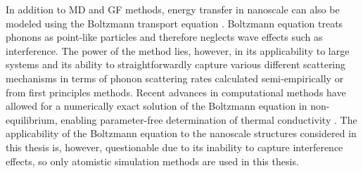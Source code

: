 In addition to MD and GF methods, energy transfer in nanoscale can also be modeled using the Boltzmann transport equation \cite{ziman}. Boltzmann equation treats phonons as point-like particles and therefore neglects wave effects such as interference. The power of the method lies, however, in its applicability to large systems and its ability to straightforwardly capture various different scattering mechanisms in terms of phonon scattering rates calculated semi-empirically or from first principles methods. Recent advances in computational methods have allowed for a numerically exact solution of the Boltzmann equation in non-equi\-lib\-rium, enabling parameter-free determination of thermal conductivity \cite{broido07,ward09,lindsay13}. The applicability of the Boltzmann equation to the nanoscale structures considered in this thesis is, however, questionable due to its inability to capture interference effects, so only atomistic simulation methods are used in this thesis.
